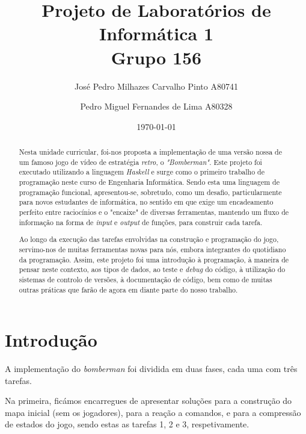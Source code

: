 \documentclass[a4paper]{article}
\title{Projeto de Laboratórios de Informática 1\\Grupo 156}
\author{José Pedro Milhazes Carvalho Pinto A80741 \and Pedro Miguel Fernandes de Lima A80328}
\date{\today}
\begin{document}
\maketitle

\begin{abstract}
   Nesta unidade curricular, foi-nos proposta a implementação de uma versão nossa
   de um famoso jogo de vídeo de estratégia \textit{retro}, o \emph{"Bomberman"}.
   Este projeto foi executado utilizando a linguagem \emph{Haskell} e surge como o
   primeiro trabalho de programação neste curso de Engenharia Informática. Sendo esta
   uma linguagem de programação funcional, apresentou-se, sobretudo, como um desafio, 
   particularmente para novos estudantes de informática, no sentido em que exige um
   encadeamento perfeito entre raciocínios e o "encaixe" de diversas ferramentas, 
   mantendo um fluxo de informação na forma de \emph{input} e \emph{output} de funções,
   para construir cada tarefa.

    Ao longo da execução das tarefas envolvidas na construção
   e programação do jogo, servimo-nos de muitas ferramentas novas para nós, embora integrantes 
   do quotidiano da programação. Assim, este projeto foi uma introdução à programação,
   à maneira de pensar neste contexto, aos tipos de dados, ao teste e \textit{debug} do
   código, à utilização do sistemas de controlo de versões, à documentação de código, bem como
   de muitas outras práticas que farão de agora em diante parte do nosso trabalho.
\end{abstract}

\pagebreak







\tableofcontents









\pagebreak 

\section{Introdução}
\label{sec:intro}

  \hspace{0.54cm}A implementação do \textit{bomberman} foi dividida em duas fases, cada 
  uma com três tarefas.

  Na primeira, ficámos encarregues de apresentar soluções para a construção 
  do mapa inicial (sem os jogadores), para a reação a comandos, e para a 
  compressão de estados do jogo, sendo estas as tarefas 1, 2 e 3, respetivamente.
\end{document}
